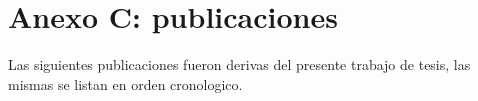 \cleardoublepage{}
{}
\FormatoAnexoC

\RemoveLabelsAxDos

\AddLabelsAxTres

\let\originalstyle=\thispagestyle            %
\def\thispagestyle#1{\fancyfoot[C]{}}       %
\def\thispagestyle#1{\originalstyle{empty}} %
\def\thispagestyle#1{}                       %

\chapter*{Anexo C: publicaciones}

  \noindent Las siguientes publicaciones fueron derivas del presente trabajo de tesis, las mismas se listan en orden cronologico.

